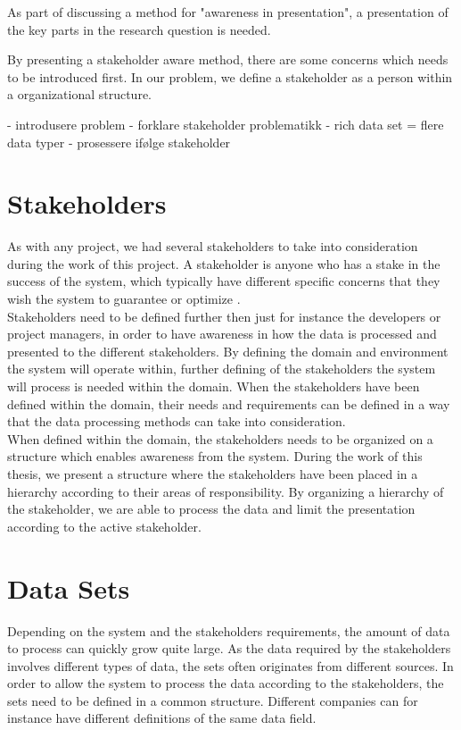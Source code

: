 As part of discussing a method for "awareness in presentation", a presentation
of the key parts in the research question is needed. 

By presenting a stakeholder aware method, there are some concerns which needs
to be introduced first. In our problem, we define a stakeholder as a person
within a organizational structure. 

- introdusere problem
- forklare stakeholder problematikk
- rich data set = flere data typer
- prosessere ifølge stakeholder


\section{Stakeholders} %
\label{sec:intro_stakeholders}  
As with any project, we had several stakeholders to take into consideration
during the work of this project. A stakeholder is anyone who has a stake in 
the success of the system, which typically have different specific concerns 
that they wish the system to guarantee or optimize 
\cite{Bass:2012:SAP:2392670}.\\

Stakeholders need to be defined further then just for instance the developers
or project managers, in order to have awareness in how the data is processed 
and presented to the different stakeholders. 
By defining the domain and environment the system will
operate within, further defining of the stakeholders the system will process 
is needed within the domain. When the stakeholders have been defined within 
the domain, their needs and requirements can be defined in a way that the data 
processing methods can take into consideration. \\

When defined within the domain, the stakeholders needs to be organized on a 
structure which enables awareness from the system. During the work of this 
thesis, we present a structure where the stakeholders have been placed in a 
hierarchy according to their areas of responsibility. By organizing a 
hierarchy of the stakeholder, we are able to process the data and limit the 
presentation according to the active stakeholder. 

\section{Data Sets} %
\label{sec:intro_data_sets}
Depending on the system and the stakeholders requirements, the amount of data
to process can quickly grow quite large. As the data required by the
stakeholders involves different types of data, the sets often originates from
different sources. In order to allow the system to process the data according
to the stakeholders, the sets need to be defined in a common structure.
Different companies can for instance have different definitions of the same
data field.


